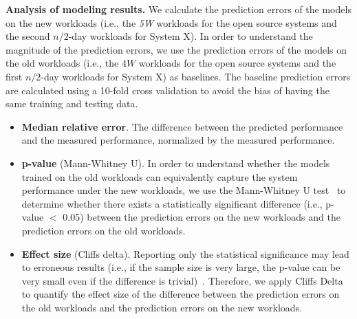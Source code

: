\noindent\textbf{Analysis of modeling results. }
We calculate the prediction errors of the models on the new workloads (i.e., the \emph{5W} workloads for the open source systems and the second $n/2$-day workloads for System X).
In order to understand the magnitude of the prediction errors, we use the prediction errors of the models on the old workloads (i.e., the $4W$ workloads for the open source systems and the first $n/2$-day workloads for System X) as baselines. The baseline prediction errors are calculated using a 10-fold cross validation to avoid the bias of having the same training and testing data.  
\begin{itemize}
    \item \textbf{Median relative error}. The difference between the predicted performance and the measured performance, normalized by the measured performance.
    \item \textbf{p-value} (Mann-Whitney U). In order to understand whether the models trained on the old workloads can equivalently capture the system performance under the new workloads, we use the Mann-Whitney U test~\cite{nachar2008mann} to determine whether there exists a statistically significant difference (i.e., p-value $<$ 0.05) between the prediction errors on the new workloads and the prediction errors on the old workloads. %
    \item \textbf{Effect size} (Cliff\textquotesingle s delta). Reporting only the statistical significance may lead to erroneous results (i.e., if the sample size is very large, the p-value can be very small even if the difference is trivial)~\cite{sullivan2012using}. Therefore, we apply Cliff\textquotesingle s Delta~\cite{cliff1996ordinal} to quantify the effect size of the difference between the prediction errors on the old workloads and the prediction errors on the new workloads. 
\end{itemize}

